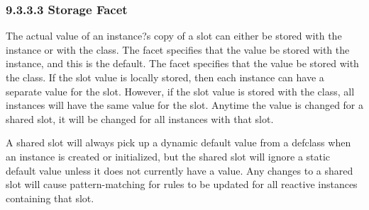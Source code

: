 \documentclass[letterpaper,10pt,english]{sphinxmanual}
\begin{document}
\begin{sphinxVerbatim}[commandchars=\\\{\}]
 
  
   
     
    
\PYG{p}{[}\PYG{p}{]}
    
\PYG{p}{[}\PYG{p}{]}
  \PYG{p}{[}\PYG{p}{]} 
  \PYG{p}{[}\PYG{p}{]} 
\end{sphinxVerbatim}


\subsubsection{9.3.3.3 Storage Facet}
\label{\detokenize{cool:storage-facet}}
The actual value of an instance?s copy of a slot can either be stored
with the instance or with the class. The  facet specifies that
the value be stored with the instance, and this is the default. The
 facet specifies that the value be stored with the class. If
the slot value is locally stored, then each instance can have a separate
value for the slot. However, if the slot value is stored with the class,
all instances will have the same value for the slot. Anytime the value
is changed for a shared slot, it will be changed for all instances with
that slot.

A shared slot will always pick up a dynamic default value from a
defclass when an instance is created or initialized, but the shared slot
will ignore a static default value unless it does not currently have a
value. Any changes to a shared slot will cause pattern-matching for
rules to be updated for all reactive instances containing that slot.
\end{document}
